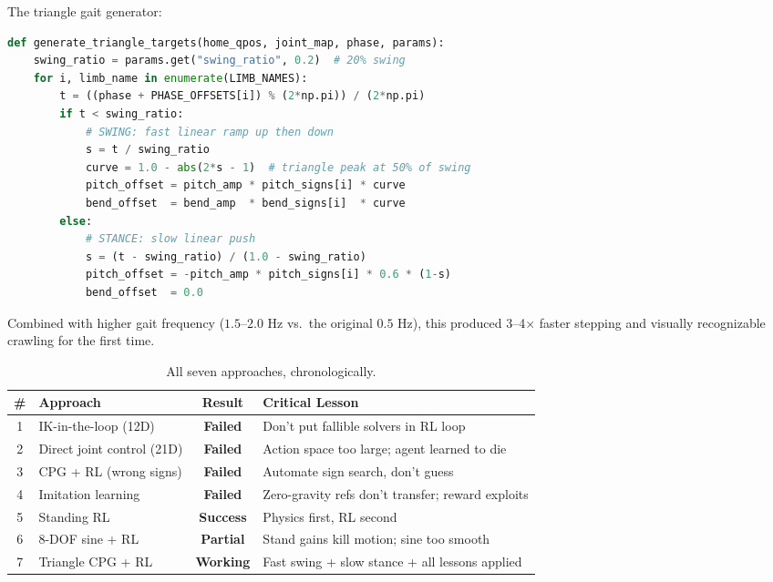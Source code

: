 \documentclass[11pt, a4paper]{article}
\begin{document}
The triangle gait generator:

\begin{lstlisting}[language=Python, caption={Piecewise triangle gait---fast swing, slow stance.}]
def generate_triangle_targets(home_qpos, joint_map, phase, params):
    swing_ratio = params.get("swing_ratio", 0.2)  # 20% swing
    for i, limb_name in enumerate(LIMB_NAMES):
        t = ((phase + PHASE_OFFSETS[i]) % (2*np.pi)) / (2*np.pi)
        if t < swing_ratio:
            # SWING: fast linear ramp up then down
            s = t / swing_ratio
            curve = 1.0 - abs(2*s - 1)  # triangle peak at 50% of swing
            pitch_offset = pitch_amp * pitch_signs[i] * curve
            bend_offset  = bend_amp  * bend_signs[i]  * curve
        else:
            # STANCE: slow linear push
            s = (t - swing_ratio) / (1.0 - swing_ratio)
            pitch_offset = -pitch_amp * pitch_signs[i] * 0.6 * (1-s)
            bend_offset  = 0.0
\end{lstlisting}

Combined with higher gait frequency ($1.5$--$2.0$ Hz vs.\ the original $0.5$ Hz), this produced 3--4$\times$ faster stepping and visually recognizable crawling for the first time.

\begin{table}[H]
\centering\small
\begin{tabular}{clcl}
\toprule
\textbf{\#} & \textbf{Approach} & \textbf{Result} & \textbf{Critical Lesson} \\
\midrule
1 & IK-in-the-loop (12D) & \textcolor{failred}{\textbf{Failed}} & Don't put fallible solvers in RL loop \\
2 & Direct joint control (21D) & \textcolor{failred}{\textbf{Failed}} & Action space too large; agent learned to die \\
3 & CPG + RL (wrong signs) & \textcolor{failred}{\textbf{Failed}} & Automate sign search, don't guess \\
4 & Imitation learning & \textcolor{failred}{\textbf{Failed}} & Zero-gravity refs don't transfer; reward exploits \\
5 & Standing RL & \textcolor{successgreen}{\textbf{Success}} & Physics first, RL second \\
6 & 8-DOF sine + RL & \textcolor{warnbrown}{\textbf{Partial}} & Stand gains kill motion; sine too smooth \\
7 & Triangle CPG + RL & \textcolor{successgreen}{\textbf{Working}} & Fast swing + slow stance + all lessons applied \\
\bottomrule
\end{tabular}
\caption{All seven approaches, chronologically.}
\end{table}
\end{document}
